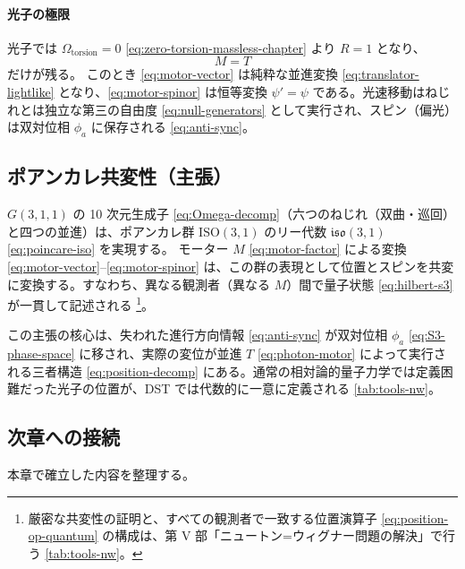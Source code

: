 \documentclass[dvipdfmx,a4paper,oneside]{jsbook}
\numberwithin{equation}{chapter}
\begin{document}
\paragraph{光子の極限}
光子では \(\Omega_{\mathrm{torsion}} = 0\) \eqref{eq:zero-torsion-massless-chapter} より \(R = 1\) となり、
\begin{equation}
  M = T
  \label{eq:photon-motor}
\end{equation}
だけが残る。
このとき \eqref{eq:motor-vector} は純粋な並進変換 \eqref{eq:translator-lightlike} となり、\eqref{eq:motor-spinor} は恒等変換 \(\psi' = \psi\) である。光速移動はねじれとは独立な第三の自由度 \eqref{eq:null-generators} として実行され、スピン（偏光）は双対位相 \(\phi_a\) に保存される \eqref{eq:anti-sync}。

\subsection{ポアンカレ共変性（主張）}

\(G(3,1,1)\) の 10 次元生成子 \eqref{eq:Omega-decomp}（六つのねじれ（双曲・巡回）と四つの並進）は、ポアンカレ群 \(\mathrm{ISO}(3,1)\) のリー代数 \(\mathfrak{iso}(3,1)\) \eqref{eq:poincare-iso} を実現する。
モーター \(M\) \eqref{eq:motor-factor} による変換 \eqref{eq:motor-vector}–\eqref{eq:motor-spinor} は、この群の表現として位置とスピンを共変に変換する。すなわち、異なる観測者（異なる \(M\)）間で量子状態 \eqref{eq:hilbert-s3} が一貫して記述される \footnote{厳密な共変性の証明と、すべての観測者で一致する位置演算子 \eqref{eq:position-op-quantum} の構成は、第 V 部「ニュートン=ウィグナー問題の解決」で行う \eqref{tab:tools-nw}。}。

この主張の核心は、失われた進行方向情報 \eqref{eq:anti-sync} が双対位相 \(\phi_a\) \eqref{eq:S3-phase-space} に移され、実際の変位が並進 \(T\) \eqref{eq:photon-motor} によって実行される三者構造 \eqref{eq:position-decomp} にある。通常の相対論的量子力学では定義困難だった光子の位置が、DST では代数的に一意に定義される \eqref{tab:tools-nw}。

\subsection{次章への接続}

本章で確立した内容を整理する。
\end{document}
